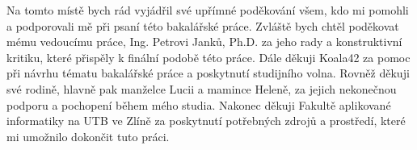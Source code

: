 \documentclass[a4paper,12pt]{article}
\begin{document}
\titulnistrana

\zadani

\prohlaseni

\abstraktaklicovaslova


\clearpage
\thispagestyle{empty}
Na tomto místě bych rád vyjádřil své upřímné poděkování všem, kdo mi pomohli a podporovali mě při psaní této bakalářské práce. Zvláště bych chtěl poděkovat mému vedoucímu práce, Ing. Petrovi Janků, Ph.D. za jeho rady a konstruktivní kritiku, které přispěly k finální podobě této práce. Dále děkuji Koala42 za pomoc při návrhu tématu bakalářské práce a poskytnutí studijního volna. Rovněž děkuji své rodině, hlavně pak manželce Lucii a mamince Heleně, za jejich nekonečnou podporu a pochopení během mého studia. Nakonec děkuji Fakultě aplikované informatiky na UTB ve Zlíně za poskytnutí potřebných zdrojů a prostředí, které mi umožnilo dokončit tuto práci.


\obsah  %


\OdsazovaniOdstavcuStart %


\OdsazovaniOdstavcuStop


\seznamlitbib




\seznamobr  %


\seznamtab  %




\end{document}
